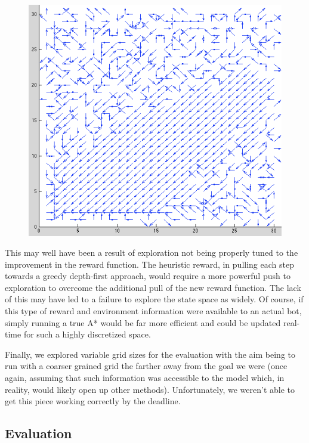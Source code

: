 \documentclass{aiaa-tc}%
\begin{document}
\begin{figure}[htbp]
  \centering
  \includegraphics[width=\linewidth]{images/HeuristicPolicy.png} 
  \label{fig:basicQ}
\end{figure}
\clearpage

This may well have been a result of exploration
not being properly tuned to the improvement in the reward
function. The heuristic reward, in pulling each step towards a greedy
depth-first approach, would require a more powerful push to exploration
to overcome the additional pull of the new reward function. The lack
of this may have led to a failure to explore
the state space as widely. Of course, if this type
of reward and environment information were available to an actual bot,
simply
running a true A* would be far more
efficient and could be updated real-time for such a highly discretized
space.

Finally, we explored variable grid sizes for the evaluation with the
aim being to run with a coarser grained grid the farther away from the
goal we were (once again, assuming that such information was
accessible to the model which, in reality, would likely open up other
methods). Unfortunately, we weren't able to get this piece working
correctly by the deadline.

\subsection{Evaluation}
\end{document}
